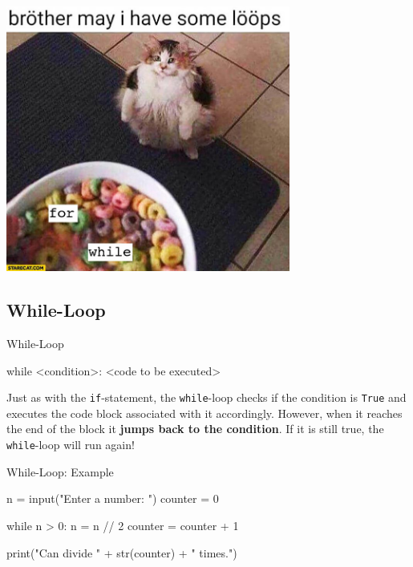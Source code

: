 \begin{frame}

    \centering\includegraphics[width=0.7\textwidth]{03_Control_Structures/da7.jpg}

\end{frame}

\subsection{While-Loop}

\begin{frame}[fragile]{While-Loop}

    \begin{pythoncode}
        while <condition>:
            <code to be executed>
    \end{pythoncode}

    \begin{block}{}
        Just as with the \texttt{if}-statement, the \texttt{while}-loop checks if the condition is \texttt{True} and executes the code block associated with it accordingly. However, when it reaches the end of the block it \textbf{jumps back to the condition}. If it is still true, the \texttt{while}-loop will run again!
    \end{block}

\end{frame}

\begin{frame}[fragile]{While-Loop: Example}

    \begin{pythoncode}
    n = input("Enter a number: ")
    counter = 0

    while n > 0:
        n = n // 2
        counter = counter + 1

    print("Can divide " + str(counter) + " times.")
    \end{pythoncode}

\end{frame}

